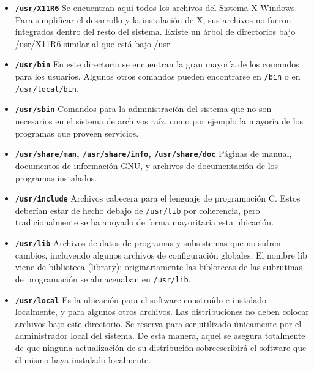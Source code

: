 \begin{itemize} 
	
	\item \textbf{\texttt{/usr/X11R6}}
	 Se encuentran aquí todos los archivos del Sistema
	X-Windows. Para simplificar el desarrollo y la instalación de X,  sus
	archivos no fueron integrados dentro del resto del sistema. Existe un
	árbol de directorios bajo /usr/X11R6 similar al que está bajo /usr.
	


	\item \textbf{\texttt{/usr/bin}}
	 En este directorio se encuentran la gran mayoría de los
	comandos para los usuarios. Algunos otros comandos pueden encontrarse en
	\texttt{/bin} o en 	\texttt{/usr/local/bin}.
	

	\item \textbf{\texttt{/usr/sbin}}
	 Comandos para la administración del sistema que no son
	necesarios en el sistema de archivos raíz, como por ejemplo la mayoría
	de los programas que proveen servicios.  

	\item \textbf{\texttt{/usr/share/man},
	\texttt{/usr/share/info},
	\texttt{/usr/share/doc}}  Páginas
	de manual, documentos de información GNU, y 		archivos de
	documentación de los programas instalados.
	

	\item \textbf{\texttt{/usr/include}}
	 Archivos cabecera para el lenguaje de programación C.
	Estos deberían estar de hecho debajo de \texttt{/usr/lib}
	por coherencia, pero tradicionalmente se ha apoyado de forma mayoritaria
	esta ubicación.  

	\item \textbf{\texttt{/usr/lib}}
	 Archivos de datos de programas y subsistemas que no
	sufren cambios, incluyendo algunos archivos de configuración globales.
	El nombre lib viene de biblioteca (library); originariamente las
	biblotecas de las subrutinas de programación se
	almacenaban en \texttt{/usr/lib}.
	

	\item \textbf{\texttt{/usr/local}}
	 Es la ubicación para el software construído e instalado localmente, y
	para algunos otros archivos.  Las distribuciones no deben colocar
	archivos bajo este directorio. Se 			reserva para ser
	utilizado únicamente por el administrador local del
	sistema. De esta manera, aquel se asegura totalmente de que ninguna
	actualización de su distribución sobreescribirá  el software que él
	mismo haya instalado localmente.


 \end{itemize} 




